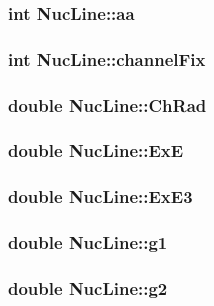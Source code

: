 \subsubsection{\setlength{\rightskip}{0pt plus 5cm}int \bf{Nuc\-Line::aa}}\label{structNucLine_6097e654f7fef5132e75097c969a3734}


\subsubsection{\setlength{\rightskip}{0pt plus 5cm}int \bf{Nuc\-Line::channel\-Fix}}\label{structNucLine_7a56386fd5bc0e9122ed5afd57d180db}


\subsubsection{\setlength{\rightskip}{0pt plus 5cm}double \bf{Nuc\-Line::Ch\-Rad}}\label{structNucLine_858f4800eeace9b615ead958289ccad7}


\subsubsection{\setlength{\rightskip}{0pt plus 5cm}double \bf{Nuc\-Line::Ex\-E}}\label{structNucLine_ae88dc20c8b3d0df13e091a2bcf03f97}


\subsubsection{\setlength{\rightskip}{0pt plus 5cm}double \bf{Nuc\-Line::Ex\-E3}}\label{structNucLine_6210e38544c08b27ed692e40d2310620}


\subsubsection{\setlength{\rightskip}{0pt plus 5cm}double \bf{Nuc\-Line::g1}}\label{structNucLine_40aa258db6161f2c15bb75442e662539}


\subsubsection{\setlength{\rightskip}{0pt plus 5cm}double \bf{Nuc\-Line::g2}}\label{structNucLine_dfe4a83ed207a68e800e082586f9000b}


